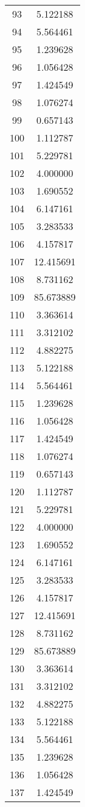 \documentclass[12pt]{article}
\begin{document}
\begin{longtable}{@{}cc@{}}
93 & 5.122188 \\
94 & 5.564461 \\
95 & 1.239628 \\
96 & 1.056428 \\
97 & 1.424549 \\
98 & 1.076274 \\
99 & 0.657143 \\
100 & 1.112787 \\
101 & 5.229781 \\
102 & 4.000000 \\
103 & 1.690552 \\
104 & 6.147161 \\
105 & 3.283533 \\
106 & 4.157817 \\
107 & 12.415691 \\
108 & 8.731162 \\
109 & 85.673889 \\
110 & 3.363614 \\
111 & 3.312102 \\
112 & 4.882275 \\
113 & 5.122188 \\
114 & 5.564461 \\
115 & 1.239628 \\
116 & 1.056428 \\
117 & 1.424549 \\
118 & 1.076274 \\
119 & 0.657143 \\
120 & 1.112787 \\
121 & 5.229781 \\
122 & 4.000000 \\
123 & 1.690552 \\
124 & 6.147161 \\
125 & 3.283533 \\
126 & 4.157817 \\
127 & 12.415691 \\
128 & 8.731162 \\
129 & 85.673889 \\
130 & 3.363614 \\
131 & 3.312102 \\
132 & 4.882275 \\
133 & 5.122188 \\
134 & 5.564461 \\
135 & 1.239628 \\
136 & 1.056428 \\
137 & 1.424549 \\

\end{longtable}
\end{document}

